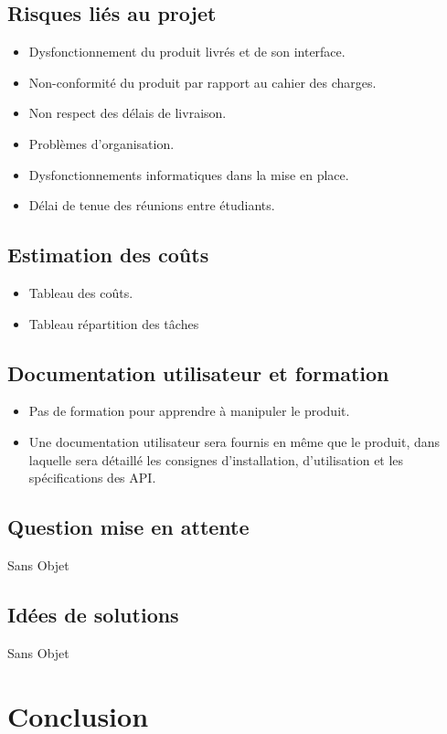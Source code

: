 		\subsection{Risques liés au projet}
			\begin{itemize}
			\item	Dysfonctionnement du produit livrés et de son interface.
			\item	Non-conformité du produit par rapport au cahier des charges.
			\item	Non respect des délais de livraison.
			\item	Problèmes d'organisation.
			\item	Dysfonctionnements informatiques dans la mise en place.
			\item	Délai de tenue des réunions entre étudiants.
			\end{itemize}
						
		\subsection{Estimation des coûts}
			\begin{itemize}
			\item Tableau des coûts.
			\item Tableau répartition des tâches
			\end{itemize}
			
		\subsection{Documentation utilisateur et formation}
			\begin{itemize}
			\item Pas de formation pour apprendre à manipuler le produit.
			\item Une documentation utilisateur sera fournis en même que le produit, dans laquelle sera détaillé les consignes d'installation, d'utilisation et les spécifications des API.
			\end{itemize}
			
		\subsection{Question mise en attente}
			Sans Objet
			
		\subsection{Idées de solutions}
			Sans Objet
			
	\section{Conclusion}


